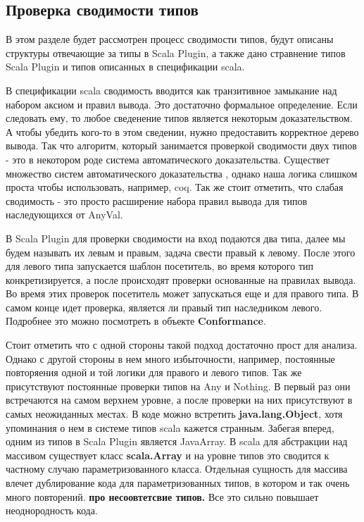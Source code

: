 

\subsection{Проверка сводимости типов}
\label{sec:conformance}

В этом разделе будет рассмотрен процесс сводимости типов, будут описаны
структуры отвечающие за типы в Scala Plugin, а также дано стравнение типов
Scala Plugin и типов описанных в спецификации scala.

В спецификации scala сводимость вводится как транзитивное замыкание над
набором аксиом и правил вывода.
Это достаточно формальное определение.
Если следовать ему, то любое сведенение типов является некоторым доказательством.
А чтобы убедить кого-то в этом сведении, нужно предоставить корректное дерево
вывода.
Так что алгоритм, который занимается проверкой сводимости двух типов - это
в некотором роде система автоматического доказательства.
Существет множество систем автоматического доказательства \cite{automata},
однако наша логика слишком проста чтобы использовать, например, coq.
Так же стоит отметить, что слабая сводимость - это просто расширение набора
правил вывода для типов наследующихся от AnyVal.

В Scala Plugin для проверки сводимости на вход подаются два типа,
далее мы будем называть их левым и правым, задача свести правый к левому.
После этого для левого типа запускается шаблон посетитель, во время которого
тип конкретизируется, а после происходят проверки основанные на правилах
вывода.
Во время этих проверок посетитель может запускаться еще и для правого типа.
В самом конце идет проверка, является ли правый тип наследником левого.
Подробнее это можно посмотреть в объекте \textbf{Conformance}.

Стоит отметить что с одной стороны такой подход достаточно прост для анализа.
Однако с другой стороны в нем много избыточности, например, постоянные повторяения
одной и той логики для правого и левого типов.
Так же присутствуют постоянные проверки типов на Any и Nothing.
В первый раз они встречаются на самом верхнем уровне, а после проверки на них
присутствуют в самых неожиданных местах.
В коде можно встретить \textbf{java.lang.Object}, хотя упоминания о
нем в системе типов scala кажется странным.
Забегая вперед, одним из типов в Scala Plugin является JavaArray.
В scala для абстракции над массивом существует класс \textbf{scala.Array} и на
уровне типов это сводится к частному случаю параметризованного класса.
Отдельная сущность для массива влечет дублирование кода для параметризованных
типов, в котором и так очень много повторений.
\textbf{про несоовтетсвие типов.}
Все это сильно повышает неоднородность кода.

